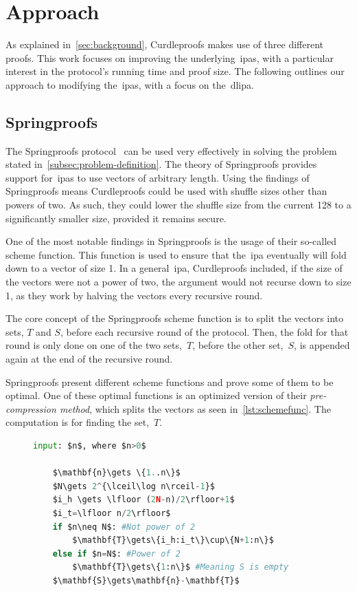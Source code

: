 \section{Approach}\label{sec:approach}
As explained in~\autoref{sec:background}, Curdleproofs makes use of three different proofs.
This work focuses on improving the underlying~\glspl{ipa}, with a particular interest in the protocol's running time and proof size.
The following outlines our approach to modifying the~\glspl{ipa}, with a focus on the~\gls{dlipa}.

\subsection{Springproofs}\label{sec:approach-springproofs}
The Springproofs protocol~\cite{zhang2024springproofs} can be used very effectively in solving the problem stated in~\autoref{subsec:problem-definition}.
The theory of Springproofs provides support for~\glspl{ipa} to use vectors of arbitrary length.
Using the findings of Springproofs means Curdleproofs could be used with shuffle sizes other than powers of two.
As such, they could lower the shuffle size from the current 128 to a significantly smaller size, provided it remains secure.

One of the most notable findings in Springproofs is the usage of their so-called scheme function.
This function is used to ensure that the~\gls{ipa} eventually will fold down to a vector of size 1.
In a general~\gls{ipa}, Curdleproofs included, if the size of the vectors were not a power of two, the argument would not recurse down to size 1, as they work by halving the vectors every recursive round.


The core concept of the Springproofs scheme function is to split the vectors into sets, $T$ and $S$, before each recursive round of the protocol.
Then, the fold for that round is only done on one of the two sets,~$T$, before the other set,~$S$, is appended again at the end of the recursive round.

Springproofs present different scheme functions and prove some of them to be optimal.
One of these optimal functions is an optimized version of their \textit{pre-compression method}, which splits the vectors as seen in~\autoref{lst:schemefunc}.
The computation is for finding the set,~$T$.

\begin{figure}[!htb]
    \begin{lstlisting}[language=Python,mathescape=true,label={lst:schemefunc},numbers=right,caption={Scheme function \textbf{\textit{f}} used in CAAUrdleproofs},captionpos=b,frame=single]
    input: $n$, where $n>0$

    $\mathbf{n}\gets \{1..n\}$
    $N\gets 2^{\lceil\log n\rceil-1}$
    $i_h \gets \lfloor (2N-n)/2\rfloor+1$
    $i_t=\lfloor n/2\rfloor$
    if $n\neq N$: #Not power of 2
        $\mathbf{T}\gets\{i_h:i_t\}\cup\{N+1:n\}$
    else if $n=N$: #Power of 2
        $\mathbf{T}\gets\{1:n\}$ #Meaning S is empty
    $\mathbf{S}\gets\mathbf{n}-\mathbf{T}$
    \end{lstlisting}
\label{fig:schemefunc}
\end{figure}


